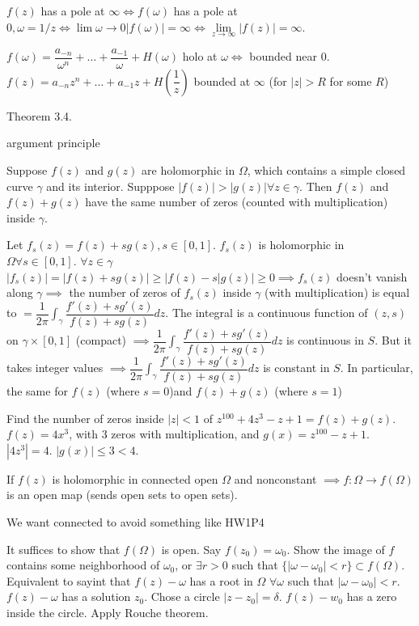 \documentclass[twoside, 10pt]{article}
\begin{document}
$f(z)$ has a pole at $\infty \iff f(\omega)$ has a pole at $0, \omega = 1/z \iff \lim\limits{\omega\to0}|f(\omega)| = \infty \iff\lim\limits_{z\to\infty}|f(z)| = \infty$.

$f(\omega) = \dfrac{a_{-n}}{\omega^n} + \ldots + \dfrac{a_{-1}}{\omega} + H(\omega)$ holo at $\omega \iff$ bounded near 0. $f(z) = a_{-n}z^n + \ldots + a_{-1}z + H(\dfrac{1}{z})$ bounded at $\infty$ (for $|z| > R$ for some $R$)

Theorem 3.4.

argument principle

\begin{thm}
   Suppose $f(z)$ and $g(z)$ are holomorphic in $\Omega$, which contains a simple closed curve $\gamma$ and its interior. Supppose $|f(z)| > |g(z)| \forall z \in \gamma$. Then $f(z)$ and $f(z) + g(z)$ have the same number of zeros (counted with multiplication) inside $\gamma$.
\end{thm}
Let $f_s(z) = f(z) + sg(z), s\in [0, 1]$. $f_s(z)$ is holomorphic in $\Omega \forall s \in [0, 1]$. $\forall z\in \gamma$ $|f_s(z)| = |f(z) + sg(z)| \geq |f(z) - s|g(z)| \geq 0 \implies f_s(z)$ doesn't vanish along $\gamma \implies $ the number of zeros of $f_s(z)$ inside $\gamma$ (with multiplication) is equal to $= \dfrac{1}{2\pi}\int_\gamma \dfrac{f'(z) + sg'(z)}{f(z) + sg(z)}dz$.
 The integral is a continuous function of $(z, s)$ on $\gamma \times [0, 1]$ (compact) %
$\implies \dfrac{1}{2\pi}\int_\gamma \dfrac{f'(z) + sg'(z)}{f(z) + sg(z)}dz$ is continuous in $S$. But it takes integer values $\implies \dfrac{1}{2\pi}\int_\gamma \dfrac{f'(z) + sg'(z)}{f(z) + sg(z)}dz$ is constant in $S$. In particular, the same for $f(z)$ (where $s = 0$)and $f(z) + g(z)$ (where $s = 1$)

\begin{exm}
   Find the number of zeros inside $|z| < 1$ of $z^{100} + 4z^3 -z + 1 = f(z) + g(z)$. $f(z) = 4x^3$, with 3 zeros with multiplication, and $g(x) = z^{100} - z + 1$. $|4z^3| = 4$. $|g(x)| \leq 3 < 4$.
\end{exm}

\begin{thm}
   If $f(z)$ is holomorphic in connected open $\Omega$ and nonconstant $\implies f: \Omega \to f(\Omega)$ is an open map (sends open sets to open sets).
\end{thm}
\begin{rmk}
   We want connected to avoid something like HW1P4
\end{rmk}
It suffices to show that $f(\Omega)$ is open. Say $f(z_0) = \omega_0$. Show the image of $f$ contains some neighborhood of $\omega_0$, or $\exists r > 0$ such that $\{|\omega-\omega_0| < r\} \subset f(\Omega)$. Equivalent to sayint that $f(z) - \omega$ has a root in $\Omega$ $\forall \omega$ such that $|\omega - \omega_0| < r$. $f(z) - \omega$ has a solution $z_0$. Chose a circle $|z - z_0| = \delta$. $f(z) - w_0$ has a zero inside the circle.
Apply Rouche theorem. 
\end{document}
